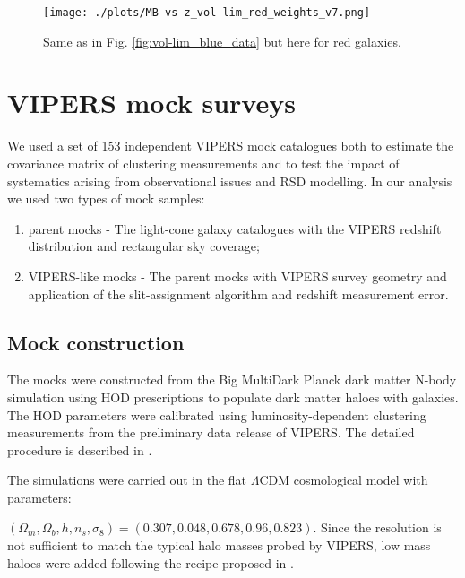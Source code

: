 \documentclass[longauth]{aa}
\def\({\left(}
\def\){\right)}
\begin{document}
\begin{figure}
    	\centering
		\texttt{[image: ./plots/MB-vs-z\_vol-lim\_red\_weights\_v7.png]}
		\caption{Same as in Fig. \ref{fig:vol-lim_blue_data} but here for red galaxies.}\label{fig:vol-lim_red_data}
	\end{figure}

\section{VIPERS mock surveys}	 						%
\label{sec:mocks}

We used a set of 153 independent VIPERS mock catalogues both to estimate the covariance matrix of clustering measurements and to test the impact of systematics arising from observational issues and RSD modelling. In our analysis we used two types of mock samples: 
\begin{enumerate}[i]
\item parent mocks - The light-cone galaxy catalogues with the VIPERS redshift distribution and rectangular sky coverage;
\item VIPERS-like mocks - The parent mocks with VIPERS survey geometry and application of the slit-assignment algorithm and redshift measurement error.
\end{enumerate}

\subsection{Mock construction}
The mocks were constructed from the Big MultiDark Planck \citep[BigMDPL,][]{prada12} dark matter N-body simulation using HOD prescriptions to populate  dark matter haloes with galaxies. The HOD parameters were calibrated using luminosity-dependent clustering measurements from the preliminary data release of VIPERS. The detailed procedure is described in \citet{delatorre13a,delatorre16}.  

The simulations were carried out in the flat $\Lambda$CDM cosmological model with parameters: 

$\(\Omega_m,\Omega_b,h,n_s,\sigma_8 \)=
\(0.307,0.048,0.678,0.96,0.823\)$. 
Since the resolution is not sufficient to match the typical halo masses probed by VIPERS, low mass haloes were added following the recipe proposed in \citet{delatorre13b}.
 
\end{document}
